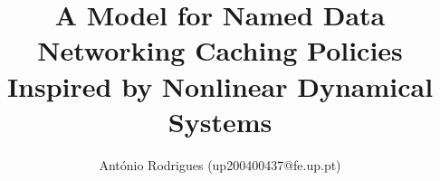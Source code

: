 \documentclass[english,journal]{IEEEtran}
\begin{document}
\title{A Model for Named Data Networking Caching Policies Inspired by 
Nonlinear Dynamical Systems}
\author{António Rodrigues (up200400437@fe.up.pt)}

\maketitle














%





\end{document}
